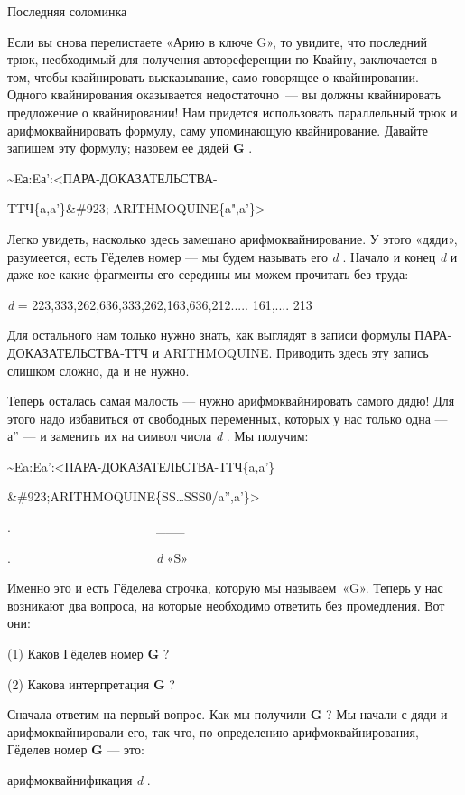 \documentclass[../main.tex]{subfiles}
\begin{document}
Последняя соломинка

Если вы снова перелистаете «Арию в ключе G», то увидите, что последний трюк, необходимый для получения автореференции по Квайну, заключается в том, чтобы квайнировать высказывание, само говорящее о квайнировании. Одного квайнирования оказывается недостаточно~--- вы должны квайнировать предложение о квайнировании! Нам придется использовать параллельный трюк и арифмоквайнировать формулу, саму упоминающую квайнирование. Давайте запишем эту формулу; назовем ее дядей \textbf{G} .

\textasciitilde Eа:Eа':\textless ПАРА-ДОКАЗАТЕЛЬСТВА-

TTЧ\{a,a'\}\&\#923; ARITHMOQUINE\{a",a'\}\textgreater{}

Легко увидеть, насколько здесь замешано арифмоквайнирование. У этого «дяди», разумеется, есть Гёделев номер --- мы будем называть его \emph{d} . Начало и конец \emph{d} и даже кое-какие фрагменты его середины мы можем прочитать без труда:

\emph{d} = 223,333,262,636,333,262,163,636,212..... 161,.... 213

Для остального нам только нужно знать, как выглядят в записи формулы ПАРА-ДОКАЗАТЕЛЬСТВА-ТТЧ и ARITHMOQUINE. Приводить здесь эту запись слишком сложно, да и не нужно.

Теперь осталась самая малость --- нужно арифмоквайнировать самого дядю! Для этого надо избавиться от свободных переменных, которых у нас только одна --- а'' --- и заменить их на символ числа \emph{d} . Мы получим:

\textasciitilde Ea:Ea':\textless ПАРА-ДОКАЗАТЕЛЬСТВА-ТТЧ\{a,a'\}

\&\#923;ARITHMOQUINE\{SS\ldots SSS0/a'',a'\}\textgreater{}

.~~~~~~~~~~~~~~~~~~~~~~~\textbar\_\_\_\textbar{}

.~~~~~~~~~~~~~~~~~~~~~~~\emph{d} «S»~

Именно это и есть Гёделева строчка, которую мы называем~«G». Теперь у нас возникают два вопроса, на которые необходимо ответить без промедления. Вот они:

(1) Каков Гёделев номер \textbf{G} ?

(2) Какова интерпретация \textbf{G} ?

Сначала ответим на первый вопрос. Как мы получили \textbf{G} ? Мы начали с дяди и арифмоквайнировали его, так что, по определению арифмоквайнирования, Гёделев номер \textbf{G} --- это:

арифмоквайнификация \emph{d} .
\end{document}
